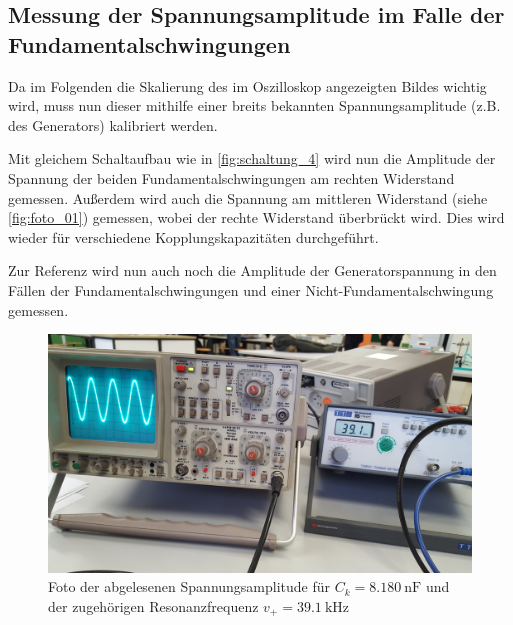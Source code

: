 \subsection{Messung der Spannungsamplitude im Falle der Fundamentalschwingungen}

Da im Folgenden die Skalierung des im Oszilloskop angezeigten Bildes wichtig wird, muss nun dieser mithilfe einer breits bekannten Spannungsamplitude (z.B. des Generators) kalibriert werden.

Mit gleichem Schaltaufbau wie in \autoref{fig:schaltung_4} wird nun die Amplitude der Spannung der beiden Fundamentalschwingungen am rechten Widerstand gemessen. Außerdem wird auch die Spannung am mittleren Widerstand (siehe \autoref{fig:foto_01}) gemessen, wobei der rechte Widerstand überbrückt wird.
Dies wird wieder für verschiedene Kopplungskapazitäten durchgeführt.

Zur Referenz wird nun auch noch die Amplitude der Generatorspannung in den Fällen der Fundamentalschwingungen und einer Nicht-Fundamentalschwingung gemessen.

\begin{figure}
    \centering
    \includegraphics[width=\textwidth/2]{images/foto_10.jpg}
    \caption{Foto der abgelesenen Spannungsamplitude für $C_k = \SI{8.180}{\nano\farad}$ und der zugehörigen Resonanzfrequenz $v_+ = \SI{39.1}{\kilo\hertz}$}
    \label{fig:foto_10}
\end{figure}